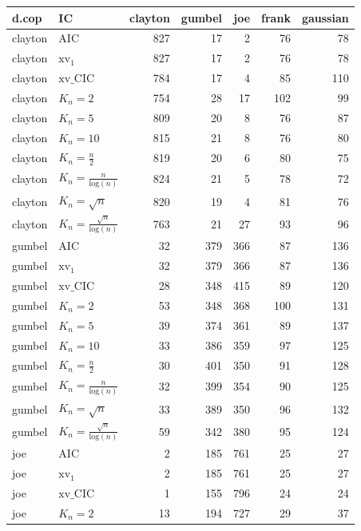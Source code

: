 \begin{table}[htbp]
\centering
\begin{tabular}{llrrrrr}
  \hline
d.cop & IC & clayton & gumbel & joe & frank & gaussian \\ 
  \hline
clayton & AIC & 827 & 17 & 2 & 76 & 78 \\ 
  clayton & $\text{xv}_{1}$ & 827 & 17 & 2 & 76 & 78 \\ 
  clayton & $\text{xv}\_\text{CIC}$ & 784 & 17 & 4 & 85 & 110 \\ 
  clayton & $K_{n}=2$ & 754 & 28 & 17 & 102 & 99 \\ 
  clayton & $K_{n}=5$ & 809 & 20 & 8 & 76 & 87 \\ 
  clayton & $K_{n}=10$ & 815 & 21 & 8 & 76 & 80 \\ 
  clayton & $K_{n}=\tfrac{n}{2}$ & 819 & 20 & 6 & 80 & 75 \\ 
  clayton & $K_{n}=\tfrac{n}{\text{log}(n)}$ & 824 & 21 & 5 & 78 & 72 \\ 
  clayton & $K_{n}=\sqrt{n}$ & 820 & 19 & 4 & 81 & 76 \\ 
  clayton & $K_{n}=\tfrac{\sqrt{n}}{\text{log}(n)}$ & 763 & 21 & 27 & 93 & 96 \\ 
   \hdashline
gumbel & AIC & 32 & 379 & 366 & 87 & 136 \\ 
  gumbel & $\text{xv}_{1}$ & 32 & 379 & 366 & 87 & 136 \\ 
  gumbel & $\text{xv}\_\text{CIC}$ & 28 & 348 & 415 & 89 & 120 \\ 
  gumbel & $K_{n}=2$ & 53 & 348 & 368 & 100 & 131 \\ 
  gumbel & $K_{n}=5$ & 39 & 374 & 361 & 89 & 137 \\ 
  gumbel & $K_{n}=10$ & 33 & 386 & 359 & 97 & 125 \\ 
  gumbel & $K_{n}=\tfrac{n}{2}$ & 30 & 401 & 350 & 91 & 128 \\ 
  gumbel & $K_{n}=\tfrac{n}{\text{log}(n)}$ & 32 & 399 & 354 & 90 & 125 \\ 
  gumbel & $K_{n}=\sqrt{n}$ & 33 & 389 & 350 & 96 & 132 \\ 
  gumbel & $K_{n}=\tfrac{\sqrt{n}}{\text{log}(n)}$ & 59 & 342 & 380 & 95 & 124 \\ 
   \hdashline
joe & AIC & 2 & 185 & 761 & 25 & 27 \\ 
  joe & $\text{xv}_{1}$ & 2 & 185 & 761 & 25 & 27 \\ 
  joe & $\text{xv}\_\text{CIC}$ & 1 & 155 & 796 & 24 & 24 \\ 
  joe & $K_{n}=2$ & 13 & 194 & 727 & 29 & 37 \\ 

\end{tabular}
\end{table}
